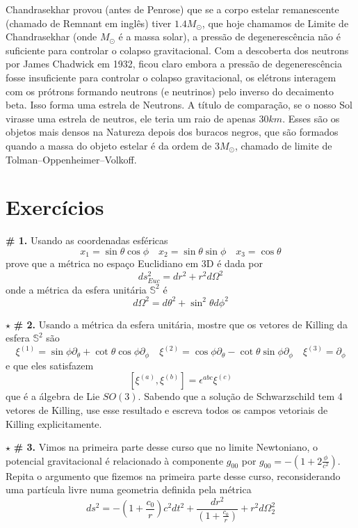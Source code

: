 \documentclass[11pt]{article}
\begin{document}
Chandrasekhar provou (antes de Penrose) que se a corpo estelar
remanescente (chamado de Remnant em inglês) tiver \(1.4 M_{\odot}\), que
hoje chamamos de Limite de Chandrasekhar (onde \(M_{\odot}\) é a massa
solar), a pressão de degenerescência não é suficiente para controlar o
colapso gravitacional. Com a descoberta dos neutrons por James Chadwick
em 1932, ficou claro embora a pressão de degenerescência fosse
insuficiente para controlar o colapso gravitacional, os elétrons
interagem com os prótrons formando neutrons (e neutrinos) pelo inverso
do decaimento beta. Isso forma uma estrela de Neutrons. A título de
comparação, se o nosso Sol virasse uma estrela de neutros, ele teria um
raio de apenas \(30km\). Esses são os objetos mais densos na Natureza
depois dos buracos negros, que são formados quando a massa do objeto
estelar é da ordem de \(3M_{\odot}\), chamado de limite de
Tolman--Oppenheimer--Volkoff.

    \hypertarget{exercuxedcios}{%
\section{Exercícios}\label{exercuxedcios}}

    \textbf{\# 1.} Usando as coordenadas esféricas
\[ x_1 = \sin\theta \cos\phi\quad 
x_2 = \sin\theta \sin\phi\quad  
x_3 = \cos\theta\] prove que a métrica no espaço Euclidiano em 3D é dada
por \[ ds^2_{Euc} = dr^2 + r^2 d\Omega^2 \] onde a métrica da esfera
unitária \(\mathbb{S}^2\) é
\[ d\Omega^2 = d\theta^2 + \sin^2 \theta d\phi^2 \]

\(\star\) \textbf{\# 2.} Usando a métrica da esfera unitária, mostre que
os vetores de Killing da esfera \(\mathbb{S}^2\) são \[ 
\xi^{(1)} = \sin\phi \partial_\theta + \cot\theta\cos\phi \partial_\phi\quad 
\xi^{(2)} = \cos\phi \partial_\theta - \cot\theta\sin\phi \partial_\phi \quad
\xi^{(3)} = \partial_\phi
\] e que eles satisfazem
\[ [\xi^{(a)}, \xi^{(b)}] = \epsilon^{abc}\xi^{(c)}  \] que é a álgebra
de Lie \(SO(3)\). Sabendo que a solução de Schwarzschild tem 4 vetores
de Killing, use esse resultado e escreva todos os campos vetoriais de
Killing explicitamente.

\(\star\) \textbf{\# 3.} Vimos na primeira parte desse curso que no
limite Newtoniano, o potencial gravitacional é relacionado à componente
\(g_{00}\) por \(g_{00} = -\left(1 + 2\frac{\phi}{c^2}\right)\). Repita
o argumento que fizemos na primeira parte desse curso, reconsiderando
uma partícula livre numa geometria definida pela métrica
\[ ds^2 = -\left(1 + \frac{c_0}{r}\right) c^2 dt^2 + \frac{dr^2}{\left(1 + \frac{c_0}{r}\right)} + r^2 d\Omega_2^2 \]
\end{document}
